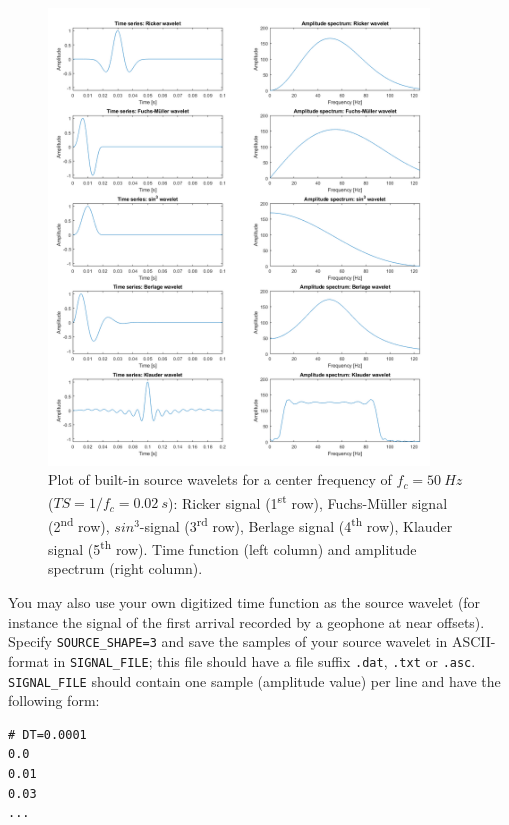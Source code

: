 \begin{figure}
\centering
    \includegraphics[width=0.9\textwidth]{figures/signals.png}
    \caption{Plot of built-in source wavelets for a center frequency of $f_c=\SI{50}{Hz}$ ($TS=1/f_c=\SI{0.02}{s}$): Ricker signal (1\textsuperscript{st} row), Fuchs-M\"uller signal (2\textsuperscript{nd} row), $sin^3$-signal (3\textsuperscript{rd} row), Berlage signal (4\textsuperscript{th} row), Klauder signal (5\textsuperscript{th} row). Time function (left column) and amplitude spectrum (right column).}
\label{fig_source_wavelets}
\end{figure}

You may also use your own digitized time function as the source wavelet (for instance the signal of the first arrival recorded by a geophone at near offsets). Specify \texttt{SOURCE\_SHAPE=3} and save the samples of your source wavelet in ASCII-format in \texttt{SIGNAL\_FILE}; this file should have a file suffix \texttt{.dat}, \texttt{.txt} or \texttt{.asc}. \texttt{SIGNAL\_FILE} should contain one sample (amplitude value) per line and have the following form:
\begin{verbatim}
# DT=0.0001
0.0
0.01
0.03
...
\end{verbatim}

